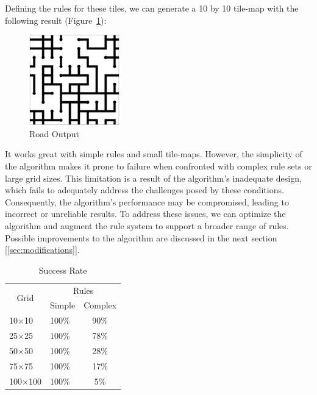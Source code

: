 \documentclass[10pt,oneside,a4paper]{article}
\begin{document}
Defining the rules for these tiles, we can generate a 10 by 10 tile-map with the following result (Figure~\ref{fig:example1map}):

\begin{figure}[ht]
    \centering
    \includegraphics[width=0.35\textwidth]{figures/roads_output.png}
    \caption{Road Output}\label{fig:example1map}
\end{figure}

It works great with simple rules and small tile-maps. 
However, the simplicity of the algorithm makes it prone to failure when confronted with complex rule sets or large grid sizes.
This limitation is a result of the algorithm's inadequate design, which fails to adequately address the challenges posed by these conditions.
Consequently, the algorithm's performance may be compromised, leading to incorrect or unreliable results.
To address these issues, we can optimize the algorithm and augment the rule system to support a broader range of rules.
Possible improvements to the algorithm are discussed in the next section [\ref*{sec:modifications}].
\newline
\begin{table}[ht]
    \centering
    \begin{tabular}{|c|cc|}
        \hline
        \multirow{2}{*}{Grid}   & \multicolumn{2}{c|}{Rules} \\ \cline{2-3} 
                                & \multicolumn{1}{c|}{Simple} 
                                & \multicolumn{1}{c|}{Complex} \\ \hline
        \multicolumn{1}{|l|}{10$\times$10} & \multicolumn{1}{l|}{100\%}  & 90\% \\ \hline
        \multicolumn{1}{|l|}{25$\times$25} & \multicolumn{1}{l|}{100\%}  & 78\% \\ \hline
        \multicolumn{1}{|l|}{50$\times$50} & \multicolumn{1}{l|}{100\%}  & 28\% \\ \hline
        \multicolumn{1}{|l|}{75$\times$75} & \multicolumn{1}{l|}{100\%}  & 17\% \\ \hline
        \multicolumn{1}{|l|}{100$\times$100} & \multicolumn{1}{l|}{100\%}  & 5\% \\ \hline
        
    \end{tabular}
    \caption{Success Rate}\label{tab:success_rate}
\end{table}     
\end{document}
